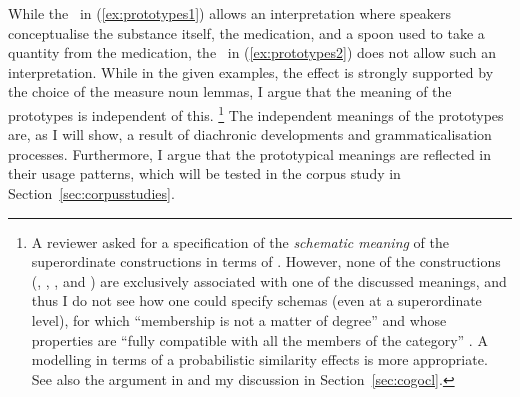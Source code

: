While the \PGCd\ in (\ref{ex:prototypes1}) allows an interpretation where speakers conceptualise the substance itself, \ie the medication, and a spoon used to take a quantity from the medication, the \NACb\ in (\ref{ex:prototypes2}) does not allow such an interpretation.
While in the given examples, the effect is strongly supported by the choice of the measure noun lemmas, I argue that the meaning of the prototypes is independent of this.%
\footnote{A reviewer asked for a specification of the \textit{schematic meaning} of the superordinate constructions in terms of \citet{Langacker1987}.
However, none of the constructions (\PGCd, \PGCa, \NACb, and \NACa) are exclusively associated with one of the discussed meanings, and thus I do not see how one could specify schemas (even at a superordinate level), for which ``membership is not a matter of degree'' and whose properties are ``fully compatible with all the members of the category'' \citep[371]{Langacker1987}.
A modelling in terms of a probabilistic similarity effects is more appropriate.
See also the argument in \citet[70--71]{Taylor2003} and my discussion in Section~\ref{sec:cogocl}.}
The independent meanings of the prototypes are, as I will show, a result of diachronic developments and grammaticalisation processes.
Furthermore, I argue that the prototypical meanings are reflected in their usage patterns, which will be tested in the corpus study in Section~\ref{sec:corpusstudies}.

